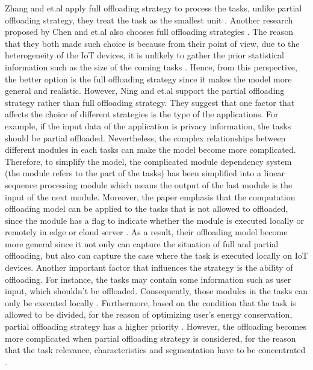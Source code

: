 \documentclass[a4paper,11pt]{article}
\begin{document}
Zhang and et.al apply full offloading strategy to process the tasks, unlike partial offloading strategy, they treat the task as the smallest unit \cite{no_cloud_1_density}. Another research proposed by Chen and et.al also chooses full offloading strategies \cite{full_offload_2}. The reason that they both made such choice is because from their point of view, due to the heterogeneity of the IoT devices, it is unlikely to gather the prior statistical information such as the size of the coming tasks \cite{no_cloud_1_density,full_offload_2}. Hence, from this perspective, the better option is the full offloading strategy since it makes the model more general and realistic. %
\newline\newline
However, Ning and et.al support the partial offloading strategy rather than full offloading strategy. They suggest that one factor that affects the choice of different strategies is the type of the applications. For example, if the input data of the application is privacy information, the tasks should be partial offloaded. Nevertheless, the complex relationships between different modules in each tasks can make the model become more complicated. Therefore, to simplify the model, the complicated module dependency system (the module refers to the part of the tasks) has been simplified into a linear sequence processing module which means the output of the last module is the input of the next module. Moreover, the paper emphasis that the computation offloading model can be applied to the tasks that is not allowed to offloaded, since the module has a flag to indicate whether the module is executed locally or remotely in edge or cloud server \cite{A_Cooperative_Partial_Computation_Offloading_Scheme_for_Mobile_Edge}. As a result, their offloading model become more general since it not only can capture the situation of full and partial offloading, but also can capture the case where the task is executed locally on IoT devices.
\newline\newline
\newpage
Another important factor that influences the strategy is the ability of offloading. For instance, the tasks may contain some information such as user input, which shouldn't be offloaded. Consequently, those modules in the tasks can only be executed locally \cite{A_Cooperative_Partial_Computation_Offloading_Scheme_for_Mobile_Edge}. Furthermore, based on the condition that the task is allowed to be divided, for the reason of optimizing user's energy conservation, partial offloading strategy has a higher priority \cite{save_energy}. However, the offloading becomes more complicated when partial offloading strategy is considered, for the reason that the task relevance, characteristics and segmentation have to be concentrated \cite{user_central}. \newline
\end{document}
